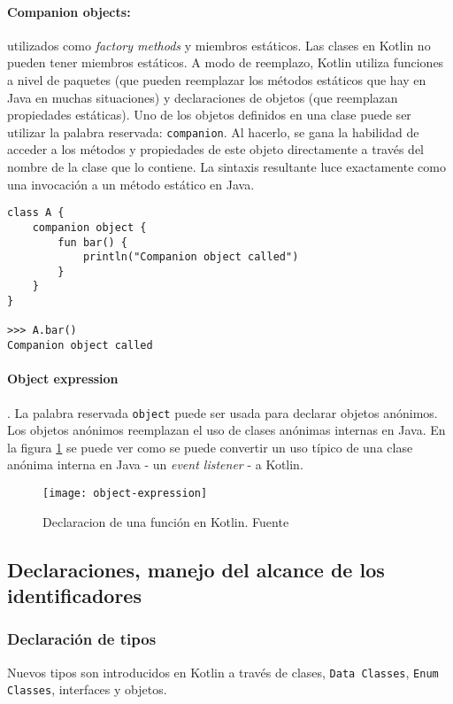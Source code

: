 \paragraph{Companion objects:} utilizados como \emph{factory methods} y miembros estáticos. Las clases en Kotlin no pueden tener miembros estáticos. A modo de reemplazo, Kotlin utiliza funciones a nivel de paquetes (que pueden reemplazar los métodos estáticos que hay en Java en muchas situaciones) y declaraciones de objetos (que reemplazan propiedades estáticas). Uno de los objetos definidos en una clase puede ser utilizar la palabra reservada: \texttt{companion}. Al hacerlo, se gana la habilidad de acceder a los métodos y propiedades de este objeto directamente a través del nombre de la clase que lo contiene. La sintaxis resultante luce exactamente como una invocación a un método estático en Java.

\begin{verbatim}
class A {
    companion object {
        fun bar() {
            println("Companion object called")
        }
    }
}

>>> A.bar()
Companion object called
\end{verbatim}

\paragraph{Object expression}. La palabra reservada \texttt{object} puede ser usada para declarar objetos anónimos. Los objetos anónimos reemplazan el uso de clases anónimas internas en Java. En la figura \ref{fig:object-expression} se puede ver como se puede convertir un uso típico de una clase anónima interna en Java - un \emph{event listener} - a Kotlin.

\begin{figure}[h!]
  \texttt{[image: object-expression]}
  \caption{Declaracion de una función en Kotlin. Fuente \cite{kotlin-in-action}}
  \label{fig:object-expression}
\end{figure} 

\subsection{Declaraciones, manejo del alcance de los identificadores} \label{sec:declaraciones}

\subsubsection{Declaración de tipos}
Nuevos tipos son introducidos en Kotlin a través de clases, \texttt{Data Classes}, \texttt{Enum Classes}, interfaces y objetos.

